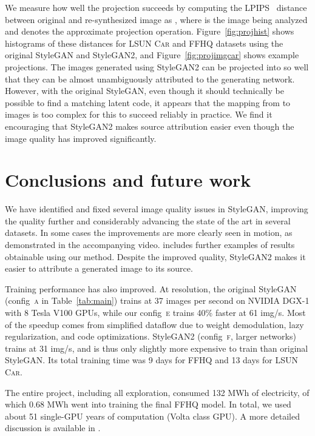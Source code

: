 \documentclass[10pt,twocolumn,letterpaper]{article}
\newcommand{\arch}[1]{\textsc{#1}}
\newcommand{\FINAL}[2][]{#2}
\begin{document}
We measure how well the projection succeeds by computing the LPIPS~\cite{Zhang2018metric} distance
between original and re-synthesized image as \mbox{}, where  is the image being analyzed
and \mbox{} denotes the approximate projection operation.
Figure~\ref{fig:projhist} shows histograms of these distances for \textsc{LSUN Car} and \textsc{FFHQ} datasets using the original StyleGAN and StyleGAN2, and
Figure~\ref{fig:projimgcar} shows example projections. 
\FINAL{The images generated using StyleGAN2 can be projected into  so well that they can be almost unambiguously attributed to the generating network.
However, with the original StyleGAN, even though it should technically be possible to find a matching latent code, it appears that the mapping from  to images is too complex for this to succeed reliably in practice.
We find it encouraging that StyleGAN2 makes source attribution easier even though the image quality has improved significantly.}

\section{Conclusions and future work}

We have identified and fixed several image quality issues in StyleGAN, improving the quality further and considerably advancing the state of the art in several datasets.
In some cases the improvements are more clearly seen in motion, as demonstrated in the accompanying video.
 includes further examples of results obtainable using our method.
\FINAL{Despite the improved quality, StyleGAN2 makes it easier to attribute a generated image to its source.}

Training performance has also improved.
At  resolution, the original StyleGAN (config~\arch{a} in Table~\ref{tab:main}) trains at 37 images per second on NVIDIA DGX-1 with 8 Tesla V100 GPUs, while our config~\arch{e} trains 40\% faster at 61 img/s.
Most of the speedup comes from simplified dataflow due to weight demodulation, lazy regularization, and code optimizations.
StyleGAN2 (config~\arch{f}, larger networks) trains at 31 img/s, and is thus only slightly more expensive to train than original StyleGAN.
Its total training time was 9 days for \textsc{FFHQ} and 13 days for \textsc{LSUN Car}.

\FINAL{The entire project, including all exploration, consumed 132 MWh of electricity, of which 0.68 MWh went into training the final \textsc{FFHQ} model. In total, we used about 51 single-GPU years of computation (Volta class GPU). A more detailed discussion is available in \refapppower{}.}
\end{document}
